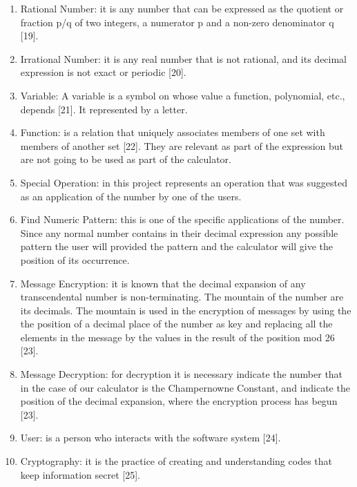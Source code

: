 \documentclass{report}
\begin{document}
\begin{enumerate}
\item Rational Number: it is any number that can be expressed as the quotient or fraction p/q of two integers, a numerator p and a non-zero denominator q [19]. \newline

\item Irrational Number: it is any real number that is not rational, and its decimal expression is not exact or periodic [20]. \newline

\item Variable: A variable is a symbol on whose value a function, polynomial, etc., depends [21]. It represented by a letter. \newline

\item Function: is a relation that uniquely associates members of one set with members of another set [22]. They are relevant as part of the expression but are not going to be used as part of the calculator.\newline

\item Special Operation:  in this project represents an operation that was suggested as an application of the number by one of the users. \newline

\item Find Numeric Pattern: this is one of the specific applications of the number. Since any normal number contains in their decimal expression any possible pattern the user will provided the pattern and the calculator will give the position of its occurrence. \newline

\item Message Encryption: it is known that the decimal expansion of any transcendental number is non-terminating. The mountain of the number are its decimals. The mountain is used in the encryption of messages by using the the position of a decimal place of the number as key and replacing all the elements in the message by the values in the result of the position mod 26 [23]. \newline

\item Message Decryption: for decryption it is necessary indicate the number that in the case of our calculator is the Champernowne Constant, and indicate the position of the decimal expansion, where the encryption process has begun [23]. \newline

\item User: is a person who interacts with the software system [24].\newline

\item Cryptography: it is the practice of creating and understanding codes that keep information secret [25]. \newline

\end{enumerate}
\end{document}
